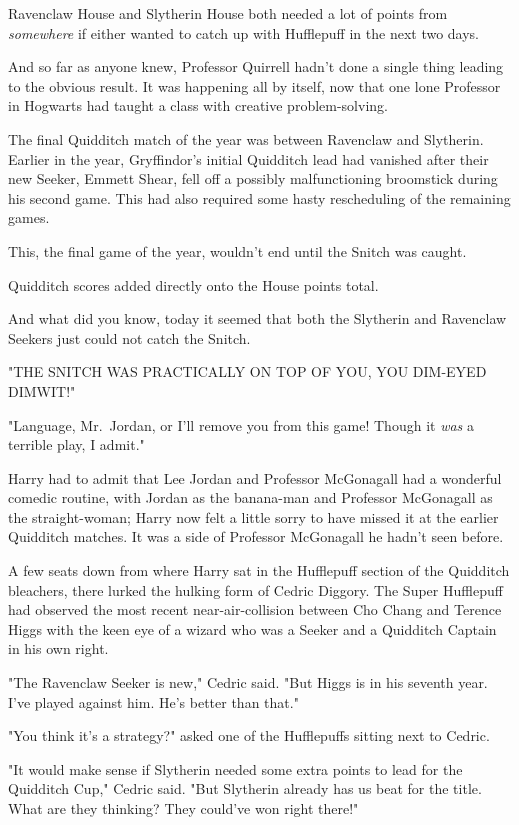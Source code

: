 Ravenclaw House and Slytherin House both needed a lot of points from
\emph{somewhere} if either wanted to catch up with Hufflepuff in the next two
days.

And so far as anyone knew, Professor Quirrell hadn't done a single thing
leading to the obvious result. It was happening all by itself, now that one
lone Professor in Hogwarts had taught a class with creative problem-solving.

The final Quidditch match of the year was between Ravenclaw and Slytherin.
Earlier in the year, Gryffindor's initial Quidditch lead had vanished after
their new Seeker, Emmett Shear, fell off a possibly malfunctioning broomstick
during his second game. This had also required some hasty rescheduling of the
remaining games.

This, the final game of the year, wouldn't end until the Snitch was caught.

Quidditch scores added directly onto the House points total.

And what did you know, today it seemed that both the Slytherin and Ravenclaw
Seekers just could{\el} not{\el} catch{\el} the{\el} Snitch.

"THE SNITCH WAS PRACTICALLY ON TOP OF YOU, YOU DIM-EYED DIMWIT!"

"Language, Mr.~Jordan, or I'll remove you from this game! Though it \emph{was}
a terrible play, I admit."

Harry had to admit that Lee Jordan and Professor McGonagall had a wonderful
comedic routine, with Jordan as the banana-man and Professor McGonagall as the
straight-woman; Harry now felt a little sorry to have missed it at the earlier
Quidditch matches. It was a side of Professor McGonagall he hadn't seen before.

A few seats down from where Harry sat in the Hufflepuff section of the
Quidditch bleachers, there lurked the hulking form of Cedric Diggory. The Super
Hufflepuff had observed the most recent near-air-collision between Cho Chang
and Terence Higgs with the keen eye of a wizard who was a Seeker and a
Quidditch Captain in his own right.

"The Ravenclaw Seeker is new," Cedric said. "But Higgs is in his seventh year.
I've played against him. He's better than that."

"You think it's a strategy?" asked one of the Hufflepuffs sitting next to
Cedric.

"It would make sense if Slytherin needed some extra points to lead for the
Quidditch Cup," Cedric said. "But Slytherin already has us beat for the title.
What are they thinking? They could've won right there!"

